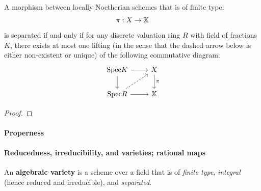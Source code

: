                     \begin{theorem} \label{theorem: valuative_criterion_for_separatedness}
                        A morphism between locally Noetherian schemes that is of finite type:
                            $$\pi: X \to \mathbb{X}$$
                        is separated if and only if for any discrete valuation ring $R$ with field of fractions $K$, there exists at most one lifting (in the sense that the dashed arrow below is either non-existent or unique) of the following commutative diagram:
                            $$
                                \begin{tikzcd}
                                	{\Spec K} & X \\
                                	{\Spec R} & \bbX
                                	\arrow[from=1-1, to=2-1]
                                	\arrow[from=1-1, to=1-2]
                                	\arrow[from=2-1, to=2-2]
                                	\arrow["\pi", from=1-2, to=2-2]
                                	\arrow[dashed, from=2-1, to=1-2]
                                \end{tikzcd}
                            $$
                    \end{theorem}
                        \begin{proof}
                            
                        \end{proof}
                
                \paragraph{Properness}
                
                \paragraph{Reducedness, irreducibility, and varieties; rational maps} 
                    \begin{definition}[Varieties] \label{def: varieties} 
                        An \textbf{algebraic variety} is a scheme over a field that is of \textit{finite type}, \textit{integral} (hence reduced and irreducible), and \textit{separated}.
                    \end{definition}